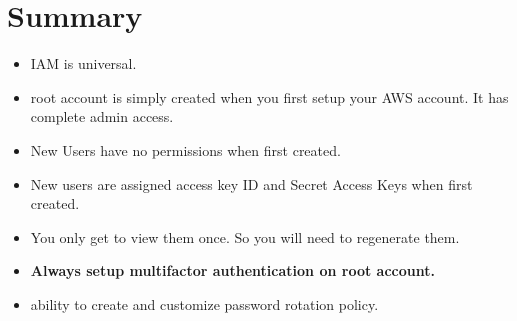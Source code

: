 \section{Summary}
\begin{itemize}
	\item IAM is universal.
	\item root account is simply created when you first setup your AWS account. It has complete admin access.
	\item New Users have no permissions when first created.
	\item New users are assigned access key ID and Secret Access Keys when first created.
	\item You only get to view them once. So you will need to regenerate them.
	\item \textbf{Always setup multifactor authentication on root account.}
	\item ability to create and customize password rotation policy.	
\end{itemize}